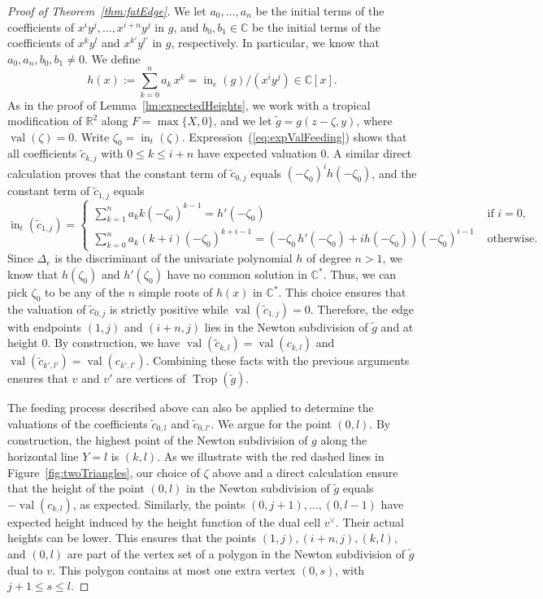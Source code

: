 \documentclass[11pt]{amsart}
\numberwithin{equation}{section}
\theoremstyle{plain}
\theoremstyle{definition}
\theoremstyle{remark}
\begin{document}
\begin{proof}[Proof of Theorem~\ref{thm:fatEdge}]
  We let $a_0,\ldots, a_n$ be the initial terms of the coefficients
  of $x^iy^j,\ldots,x^{i+n}y^j$ in $g$, and $b_0, b_1\in {\mathbb{C}}$ be the
  initial terms of the coefficients of $x^ky^{l}$ and $x^{k'}y^{l'}$
  in $g$, respectively. In particular, we know that
  $a_0,a_n,b_0,b_1\neq 0$. We define
\[h(x):=\sum_{k=0}^{n}a_k\,x^{k}=\operatorname{in}_e(g)/(x^iy^j) \in {\mathbb{C}}[x].
\]
\indent  As in the proof of Lemma~\ref{lm:expectedHeights}, we work with a
  tropical modification of ${\mathbb{R}}^2$ along $F=\max\{X,0\}$, and we let
  $\tilde{g}=g(z-{\zeta},y)$, where
  $\operatorname{val}({\zeta})=0$. Write ${\zeta}_0=\operatorname{in}_t({\zeta})$. Expression~(\ref{eq:expValFeeding}) shows that all
  coefficients $\tilde{c}_{k,j}$ with $0\leq k\leq i+n$ have expected
  valuation 0. A similar direct calculation proves that the constant
  term of $\tilde{c}_{0,j}$ equals $(-{\zeta}_0)^ih(-{\zeta}_0)$, and the constant
  term of $\tilde{c}_{1,j}$ equals
\[
\operatorname{in}_t(\tilde{c}_{1,j})=\begin{cases}
  \sum_{k=1}^n a_{k}k(-{\zeta}_0)^{k-1}=h'(-{\zeta}_0)& \text{ if } i=0,\\
\sum_{k=0}^n a_k(k+i)(-{\zeta}_0)^{k+i-1}= (-{\zeta}_0\,h'(-{\zeta}_0)+ i h(-{\zeta}_0))(-{\zeta}_0)^{i-1} &  \text{ otherwise}.
\end{cases}
\]
\indent Since $\Delta_e$ is the discriminant of the univariate polynomial $h$
of degree $n>1$, we know that $h({\zeta}_0)$ and $h'({\zeta}_0)$ have no
common solution in ${\mathbb{C}}^*$. Thus, we can pick ${\zeta}_0$ to be any of the
$n$ simple roots of $h(x)$ in ${\mathbb{C}}^*$.  This choice ensures that the
valuation of $\tilde{c}_{0,j}$ is strictly positive while
$\operatorname{val}(\tilde{c}_{1,j})=0$. Therefore, the edge with endpoints $(1,j)$
and $(i+n,j)$ lies in the Newton subdivision of $\tilde{g}$ and at
height 0.  By construction, we have
$\operatorname{val}(\tilde{c}_{k,l})=\operatorname{val}({c}_{k,l})$ and
$\operatorname{val}(\tilde{c}_{k',l'})=\operatorname{val}({c}_{k',l'})$. Combining these facts
with the previous arguments ensures that $v$ and $v'$ are vertices of
$\operatorname{Trop}(\tilde{g})$.

The feeding process described above can also be applied to determine
the valuations of the coefficients $\tilde{c}_{0,l}$ and
$\tilde{c}_{0,l'}$. We argue for the point $(0,l)$.  By construction,
the highest point of the Newton subdivision of $g$ along the
horizontal line $Y=l$ is $(k,l)$.  As we illustrate with the red
dashed lines in Figure~\ref{fig:twoTriangles}, our choice of ${\zeta}$
above and a direct calculation ensure that the height of the point
$(0,l)$ in the Newton subdivision of $\tilde{g}$ equals
$-\operatorname{val}(c_{k,l})$, as expected.  Similarly, the points $(0,j+1),\ldots,
(0,l-1)$ have expected height induced by the height function of the
dual cell $v^{\vee}$. Their actual heights can be lower. This ensures
that the points $(1,j), (i+n,j), (k,l)$, and $(0,l)$ are part of the
vertex set of a polygon in the Newton subdivision of $\tilde{g}$ dual
to $v$. This polygon contains at most one extra vertex $(0,s)$, with
$j+1\leq s \leq l$.


\end{proof}
\end{document}
